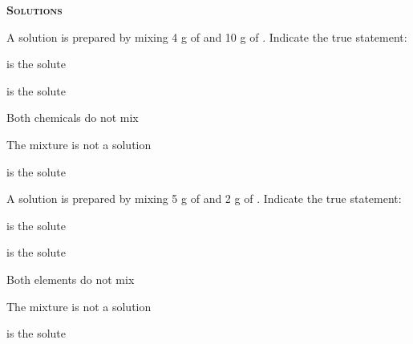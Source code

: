 \documentclass[main.tex]{subfiles}
\begin{document}
\newpage
\setdoublesep{0.35700 em}  %
\setatomsep{1.78500 em}    %
\setbondoffset{0.18265 em} %
\newcommand{\bondwidth}{0.06642 em} %
\setbondstyle{line width = \bondwidth}
\fancyhfoffset[E,O]{0pt}
\setlength{\columnsep}{30pt}
\begin{conclusion}
\end{conclusion}
\begin{multicols*}{2}\setcounter{numA}{1}


{\raggedright\textsc{\textbf{Solutions }}\par}
\begin{question}[ID=\the\value{numA}]
A solution is prepared by mixing 4 g of  and 10 g of . Indicate the true statement:
\begin{inparaenum}[(a)]	
\item {} is the solute
\item{} is the solute
\item Both chemicals do not mix
\item The mixture is not a solution
\end{inparaenum} 
\end{question}
\begin{solution}
  is the solute
\hspace{0.1cm}\end{solution}%

\begin{question}[ID=\the\value{numA}]
A solution is prepared by mixing 5 g of  and 2 g of . Indicate the true statement:
\begin{inparaenum}[(a)]	
\item {} is the solute
\item{} is the solute
\item Both elements do not mix
\item The mixture is not a solution
\end{inparaenum} 
\end{question}
\begin{solution}
  is the solute
\hspace{0.1cm}\end{solution}%


\end{multicols*}
\end{document}
